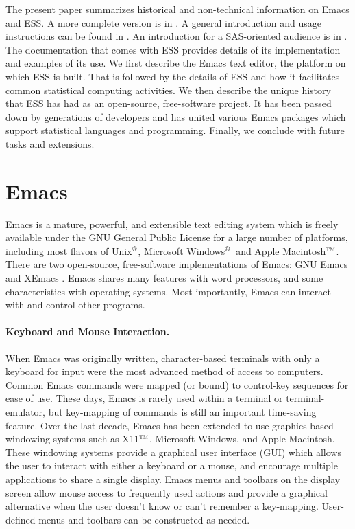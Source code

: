 \documentclass{article}
\newcommand*{\regstrd}{$^{\mbox{\scriptsize{\textregistered}}}$}
\newcommand*{\tm}{$^{\mbox{\scriptsize\sc tm}}$}
\begin{document}
The present paper summarizes historical and non-technical information on
Emacs and ESS.  A more complete version is in \citep{RMHHS:2001}.
A general introduction and usage instructions can be
found in \citep{heiberger:dsc:2001}.
An introduction for a SAS-oriented audience is in
\citep{heiberger:philasugi:2001}.  The documentation that comes with
ESS provides details of its implementation and examples of its use.
We first describe the Emacs text editor, the platform on which ESS is
built.  That is followed by the details of ESS and how it facilitates
common statistical computing activities.  We then describe the unique
history that ESS has had as an open-source, free-software project.
It has been passed down by generations of developers and has
united various Emacs packages which support
statistical languages and programming.  Finally, we conclude with
future tasks and extensions.

\section{Emacs}
\label{sec:emacs}

Emacs is a mature, powerful, and extensible text editing system which
is freely available under the GNU General Public License for a large
number of platforms, including most flavors of Unix\regstrd, Microsoft Windows\regstrd\
and Apple Macintosh\tm.  There are two open-source, free-software
implementations of Emacs:  GNU Emacs \citep{GNU-Emacs} and XEmacs
\citep{XEmacs}.  Emacs shares many features with
word processors, and some characteristics with operating systems.
Most importantly, Emacs can interact with and control other programs.

\paragraph{Keyboard and Mouse Interaction.}
When Emacs was originally written, character-based terminals with only
a keyboard for input were the most advanced method of access to
computers.  Common Emacs commands were mapped (or bound) to control-key
sequences for ease of use.  These days, Emacs is
rarely used within a terminal or terminal-emulator, but key-mapping of
commands is still an important time-saving feature.  Over the last
decade, Emacs has been extended to use graphics-based windowing
systems such as X11\tm, Microsoft Windows, and Apple Macintosh.  These
windowing systems provide a graphical user interface (GUI) which
allows the user to interact with either a keyboard or a mouse, and encourage
multiple applications to share a single display.  Emacs menus and
toolbars on the display screen allow mouse access to frequently used
actions and provide a graphical alternative
when the user doesn't know or can't remember a key-mapping.  User-defined
menus and toolbars can be constructed as needed.
\end{document}
